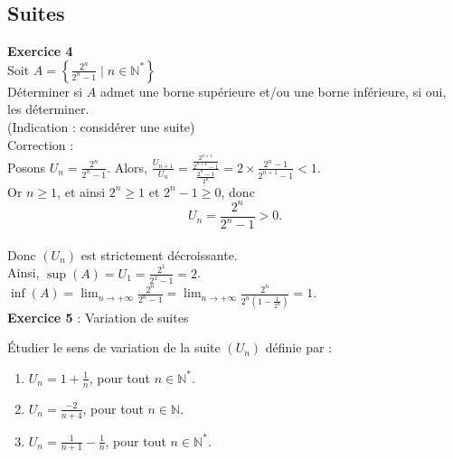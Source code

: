 \documentclass[a4paper, 12pt]{article}
\begin{document}
\subsection*{Suites}

\textbf{Exercice 4} \\

Soit \(A = \left\{\frac{2^n}{2^n - 1} \mid n \in \mathbb{N}^*\right\}\) \\

Déterminer si \(A\) admet une borne supérieure et/ou une borne inférieure, si oui, les déterminer. \\
(Indication : considérer une suite) \\

Correction : \\
Posons \(U_n = \frac{2^n}{2^n - 1}\). Alors, \(\frac{U_{n+1}}{U_n} = \frac{\frac{2^{n+1}}{2^{n+1}-1}}{\frac{2^n-1}{2^n}} = 2 \times \frac{2^n - 1}{2^{n+1} - 1} < 1\). \\

Or \( n \geq 1 \), et ainsi \( 2^n \geq 1 \) et \( 2^n - 1 \geq 0 \), donc
\[
U_n = \frac{2^n}{2^n - 1} > 0.
\] \\
Donc \((U_n)\) est strictement décroissante. \\
Ainsi, \(\sup(A) = U_1 = \frac{2^1}{2^1 - 1} = 2\). \\
\(\inf(A) = \lim_{n \to +\infty} \frac{2^n}{2^n - 1} = \lim_{n \to +\infty} \frac{2^n}{2^n(1 - \frac{1}{2^n})} = 1\).\\

\textbf{Exercice 5} : Variation de suites

Étudier le sens de variation de la suite \((U_n)\) définie par : 
\begin{enumerate}
    \item \(U_n = 1 + \frac{1}{n}\), pour tout \(n \in \mathbb{N}^*\).
    \item \(U_n = \frac{-2}{n+4}\), pour tout \(n \in \mathbb{N}\).
    \item \(U_n = \frac{1}{n+1} - \frac{1}{n}\), pour tout \(n \in \mathbb{N}^*\).
\end{enumerate}
\end{document}
